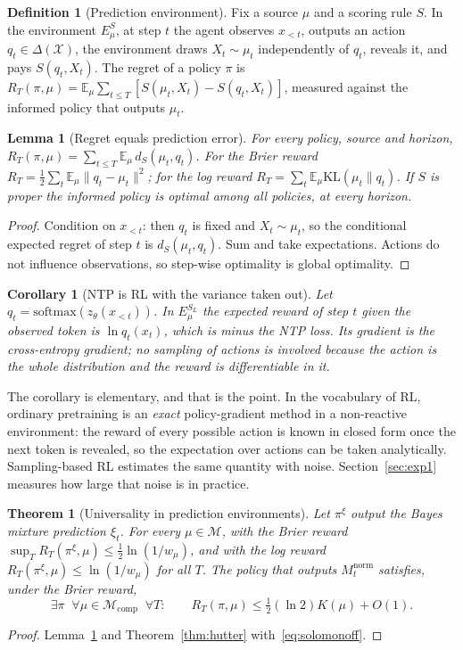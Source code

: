 \documentclass[11pt]{article}
\newtheorem{theorem}{Theorem}
\newtheorem{lemma}{Lemma}
\newtheorem{corollary}{Corollary}
\theoremstyle{definition}
\newtheorem{definition}{Definition}
\newcommand{\X}{\mathcal{X}}
\newcommand{\Del}{\Delta(\X)}
\newcommand{\E}{\mathbb{E}}
\newcommand{\KL}{\mathrm{KL}}
\newcommand{\Mcomp}{\mathcal{M}_{\mathrm{comp}}}
\begin{document}
\begin{definition}[Prediction environment]\label{def:env}
Fix a source $\mu$ and a scoring rule $S$. In the environment $E^S_\mu$, at step $t$ the agent observes $x_{<t}$, outputs an action $q_t\in\Del$, the environment draws $X_t\sim\mu_t$ independently of $q_t$, reveals it, and pays $S(q_t,X_t)$. The regret of a policy $\pi$ is $R_T(\pi,\mu)=\E_\mu\sum_{t\le T}[S(\mu_t,X_t)-S(q_t,X_t)]$, measured against the informed policy that outputs $\mu_t$.
\end{definition}

\begin{lemma}[Regret equals prediction error]\label{lem:regret}
For every policy, source and horizon, $R_T(\pi,\mu)=\sum_{t\le T}\E_\mu\,d_S(\mu_t,q_t)$. For the Brier reward $R_T=\frac12\sum_t\E_\mu\|q_t-\mu_t\|^2$; for the log reward $R_T=\sum_t\E_\mu\KL(\mu_t\|q_t)$. If $S$ is proper the informed policy is optimal among all policies, at every horizon.
\end{lemma}
\begin{proof}
Condition on $x_{<t}$: then $q_t$ is fixed and $X_t\sim\mu_t$, so the conditional expected regret of step $t$ is $d_S(\mu_t,q_t)$. Sum and take expectations. Actions do not influence observations, so step-wise optimality is global optimality.
\end{proof}

\begin{corollary}[NTP is RL with the variance taken out]\label{cor:ntp}
Let $q_t=\mathrm{softmax}(z_\theta(x_{<t}))$. In $E^{S_L}_\mu$ the expected reward of step $t$ given the observed token is $\ln q_t(x_t)$, which is minus the NTP loss. Its gradient is the cross-entropy gradient; no sampling of actions is involved because the action is the whole distribution and the reward is differentiable in it.
\end{corollary}

\noindent The corollary is elementary, and that is the point. In the vocabulary of RL, ordinary pretraining is an \emph{exact} policy-gradient method in a non-reactive environment: the reward of every possible action is known in closed form once the next token is revealed, so the expectation over actions can be taken analytically. Sampling-based RL estimates the same quantity with noise. Section~\ref{sec:exp1} measures how large that noise is in practice.

\begin{theorem}[Universality in prediction environments]\label{thm:universal}
Let $\pi^\xi$ output the Bayes mixture prediction $\xi_t$. For every $\mu\in\mathcal M$, with the Brier reward $\sup_TR_T(\pi^\xi,\mu)\le\frac12\ln(1/w_\mu)$, and with the log reward $R_T(\pi^\xi,\mu)\le\ln(1/w_\mu)$ for all $T$. The policy that outputs $M^{\mathrm{norm}}_t$ satisfies, under the Brier reward,
\[
\exists\pi\;\;\forall\mu\in\Mcomp\;\;\forall T:\qquad R_T(\pi,\mu)\le\tfrac12(\ln2)K(\mu)+O(1).
\]
\end{theorem}
\begin{proof}
Lemma~\ref{lem:regret} and Theorem~\ref{thm:hutter} with~\eqref{eq:solomonoff}.
\end{proof}
\end{document}
